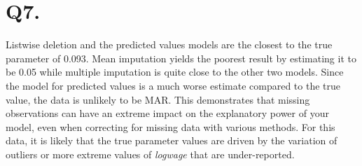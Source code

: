 \documentclass{article}
\begin{document}
\section*{Q7.}
Listwise deletion and the predicted values models are the closest to the true parameter of 0.093. Mean imputation yields the poorest result by estimating it to be 0.05 while multiple imputation is quite close to the other two models. Since the model for predicted values is a much worse estimate compared to the true value, the data is unlikely to be MAR. This demonstrates that missing observations can have an extreme impact on the explanatory power of your model, even when correcting for missing data with various methods. For this data, it is likely that the true parameter values are driven by the variation of outliers or more extreme values of \textit{logwage} that are under-reported.
\end{document}
